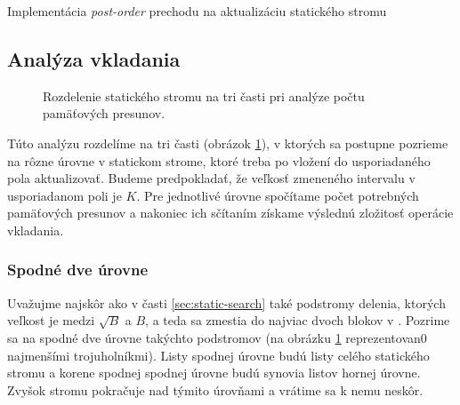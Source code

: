 \begin{algorithm}
    \caption{Implementácia \emph{post-order} prechodu na aktualizáciu statického stromu}
    \label{alg:postorder}
    \begin{algorithmic}[1]
         
        \Statex {}
        \Statex
             
                \State \Return {}
            \EndIf
            \Statex
            \Else
                \State {} 
                \State {} 
                \Statex
                 
            \EndIf           
        \EndFunction
    \end{algorithmic}
\end{algorithm}

\subsection{Analýza vkladania}

\begin{figure}
    \centering
    \resizebox{\textwidth}{!}{
        
    }
    \caption[Rozdelenie statického stromu]{Rozdelenie statického stromu na tri časti pri analýze počtu pamäťových presunov.}
    \label{fig:cobtree_analysis_parts}
\end{figure}

Túto analýzu rozdelíme na tri časti (obrázok \ref{fig:cobtree_analysis_parts}), v ktorých sa postupne pozrieme na rôzne úrovne v statickom strome, ktoré treba po vložení do usporiadaného pola aktualizovať. Budeme predpokladať, že veľkosť zmeneného intervalu v usporiadanom poli je $K$. Pre jednotlivé úrovne spočítame počet potrebných pamäťových presunov a nakoniec ich sčítaním získame výslednú zložitosť operácie vkladania.

\subsubsection{Spodné dve úrovne}
Uvažujme najskôr ako v časti \ref{sec:static-search} také podstromy  delenia, ktorých veľkost je medzi $\sqrt{B}$ a $B$, a teda sa zmestia do najviac dvoch blokov v \cache. Pozrime sa na spodné dve úrovne takýchto podstromov (na obrázku \ref{fig:cobtree_analysis_parts} reprezentovan0 najmenšími trojuholníkmi). Listy spodnej úrovne budú listy celého statického stromu a korene spodnej spodnej úrovne budú synovia listov hornej úrovne. Zvyšok stromu pokračuje nad týmito úrovňami a vrátime sa k nemu neskôr.

